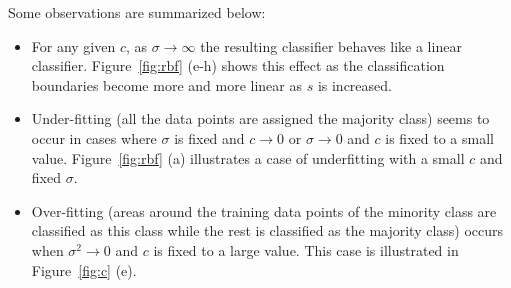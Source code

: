 \documentclass{article}
\begin{document}
Some observations are summarized below:

\begin{itemize}  
\item For any given $c$, as $\sigma \to \infty$ the resulting classifier behaves like a linear classifier. Figure~\ref{fig:rbf} (e-h) shows this effect as the classification boundaries become more and more linear as $s$ is increased.
\item Under-fitting (all the data points are assigned the majority class) seems to occur in cases where $\sigma$ is fixed and $c \to 0$ or $\sigma \to 0$ and $c$ is fixed to a small value. Figure~\ref{fig:rbf} (a) illustrates a case of underfitting with a small $c$ and fixed $\sigma$.
\item Over-fitting (areas around the training data points of the minority class are classified as this class while the rest is classified as the majority class) occurs when $\sigma^2 \to 0$ and $c$ is fixed to a large value. This case is illustrated in Figure~\ref{fig:c} (e).

\end{itemize}
\end{document}
